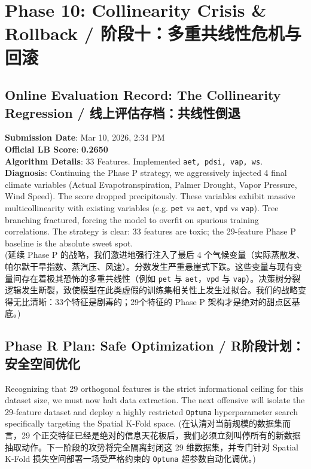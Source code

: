 \section{Phase 10: Collinearity Crisis \& Rollback / 阶段十：多重共线性危机与回滚}

\subsection{Online Evaluation Record: The Collinearity Regression / 线上评估存档：共线性倒退}
\begin{warningbox}
\textbf{Submission Date}: Mar 10, 2026, 2:34 PM \\
\textbf{Official LB Score}: \textbf{0.2650} \\
\textbf{Algorithm Details}: 33 Features. Implemented \texttt{aet, pdsi, vap, ws}. \\
\textbf{Diagnosis}: Continuing the Phase P strategy, we aggressively injected 4 final climate variables (Actual Evapotranspiration, Palmer Drought, Vapor Pressure, Wind Speed). The score dropped precipitously. These variables exhibit massive multicollinearity with existing variables (e.g. \texttt{pet} vs \texttt{aet}, \texttt{vpd} vs \texttt{vap}). Tree branching fractured, forcing the model to overfit on spurious training correlations. The strategy is clear: 33 features are toxic; the 29-feature Phase P baseline is the absolute sweet spot. \\
(延续 Phase P 的战略，我们激进地强行注入了最后 4 个气候变量（实际蒸散发、帕尔默干旱指数、蒸汽压、风速）。分数发生严重悬崖式下跌。这些变量与现有变量间存在着极其恐怖的多重共线性（例如 \texttt{pet} 与 \texttt{aet}，\texttt{vpd} 与 \texttt{vap}）。决策树分裂逻辑发生断裂，致使模型在此类虚假的训练集相关性上发生过拟合。我们的战略变得无比清晰：33个特征是剧毒的；29个特征的 Phase P 架构才是绝对的甜点区基底。)
\end{warningbox}

\subsection{Phase R Plan: Safe Optimization / R阶段计划：安全空间优化}
Recognizing that 29 orthogonal features is the strict informational ceiling for this dataset size, we must now halt data extraction. The next offensive will isolate the 29-feature dataset and deploy a highly restricted \texttt{Optuna} hyperparameter search specifically targeting the Spatial K-Fold space.
(在认清对当前规模的数据集而言，29 个正交特征已经是绝对的信息天花板后，我们必须立刻叫停所有的新数据抽取动作。下一阶段的攻势将完全隔离封闭这 29 维数据集，并专门针对 Spatial K-Fold 损失空间部署一场受严格约束的 \texttt{Optuna} 超参数自动化调优。)

